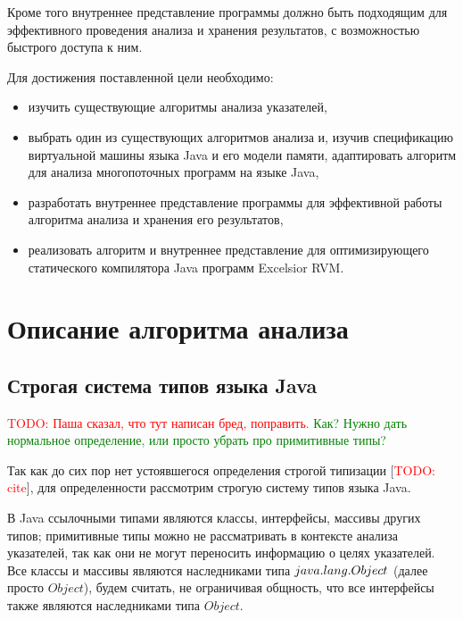 \documentclass[14pt,titlepage]{extarticle}
\newcommand{\remark}[1]{\textcolor{Green}{#1}}
\newcommand{\todo}[1]{\textcolor{red}{\eng{TODO}: #1}}
\newcommand{\todocite}{[\todo{cite}]}
\newcommand{\eng}[1]{{\English#1}}
\let\oldsection\section
\renewcommand{\section}{\newpage\oldsection}
\begin{document}
    Кроме того внутреннее представление программы должно быть подходящим для
    эффективного проведения анализа и хранения результатов, с возможностью
    быстрого доступа к ним.

    Для достижения поставленной цели необходимо:
    \begin{itemize}
      \item изучить существующие алгоритмы анализа указателей,
      \item выбрать один из существующих алгоритмов анализа и, изучив
            спецификацию виртуальной машины языка Java и его модели памяти,
            адаптировать алгоритм для анализа многопоточных программ на языке
            Java,
      \item разработать внутреннее представление программы для эффективной
            работы алгоритма анализа и хранения его результатов,
      \item реализовать алгоритм и внутреннее представление для оптимизирующего
            статического компилятора Java программ \eng{Excelsior RVM}.
    \end{itemize}

  \section{Описание алгоритма анализа}
    \label{section:algorithm}

    \subsection{Строгая система типов языка Java}
      \label{section:type_system}

      \todo{Паша сказал, что тут написан бред, поправить.}
      \remark{Как? Нужно дать нормальное определение, или просто убрать
      про примитивные типы?}

      Так как до сих пор нет устоявшегося определения строгой типизации
      \todocite, для определенности рассмотрим строгую систему типов языка
      Java.

      В Java ссылочными типами являются классы, интерфейсы, массивы других
      типов; примитивные типы можно не рассматривать в контексте анализа
      указателей, так как они не могут переносить информацию о целях
      указателей. Все классы и массивы являются наследниками типа
      $java\-.lang\-.Object$ (далее просто $Object$), будем считать,
      не ограничивая общность, что все интерфейсы также являются
      наследниками типа $Object$.
\end{document}
